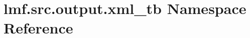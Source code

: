 \hypertarget{namespacelmf_1_1src_1_1output_1_1xml__tb}{\section{lmf.\+src.\+output.\+xml\+\_\+tb Namespace Reference}
\label{namespacelmf_1_1src_1_1output_1_1xml__tb}
}
